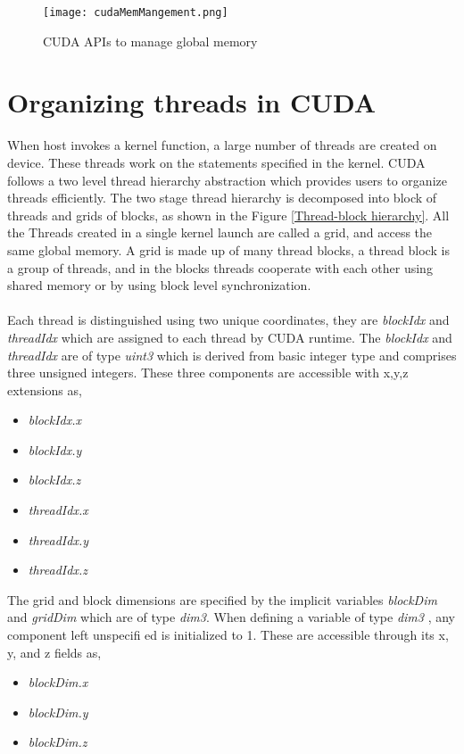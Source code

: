 \begin{figure}[h!]
  \centering
  \texttt{[image: cudaMemMangement.png]}
  \caption{CUDA APIs to manage global memory \cite{ProfessionalCUDA}}
  \label{Memory management}
\end{figure}
\section{Organizing threads in CUDA}
When host invokes a kernel function, a large number of threads are created on device\cite{ProfessionalCUDA}. These threads work on the statements specified in the kernel. CUDA follows a two level thread hierarchy abstraction which provides users to organize threads efficiently. The two stage thread hierarchy is decomposed into block of threads and grids of blocks, as shown in the Figure \ref{Thread-block hierarchy}. All the Threads created in a single kernel launch are called a grid, and access the same global memory. A grid is made up of many thread blocks, a thread block is a group of threads, and in the blocks threads cooperate with each other using shared memory or by using block level synchronization.\paragraph*{}Each thread is distinguished using two unique 	coordinates, they are \textit{blockIdx} and \textit{threadIdx} which are assigned to each thread by CUDA runtime. The \textit{blockIdx} and \textit{threadIdx} are of type \textit{uint3} which is derived from basic integer type and comprises three unsigned integers. These three components are accessible with x,y,z extensions as,
\begin{itemize}
\item \textit{blockIdx.x}
\item \textit{blockIdx.y}
\item \textit{blockIdx.z}
\item \textit{threadIdx.x}
\item \textit{threadIdx.y}
\item \textit{threadIdx.z}
\end{itemize}
The grid and block dimensions are specified by the implicit variables \textit{blockDim} and \textit{gridDim} which are of type \textit{dim3}. When defining a variable of type \textit{dim3 }, any component left unspecifi ed is initialized to 1. These are accessible through its x, y, and z fields as,
\begin{itemize}
\item \textit{blockDim.x}
\item \textit{blockDim.y}
\item \textit{blockDim.z}
\end{itemize}
